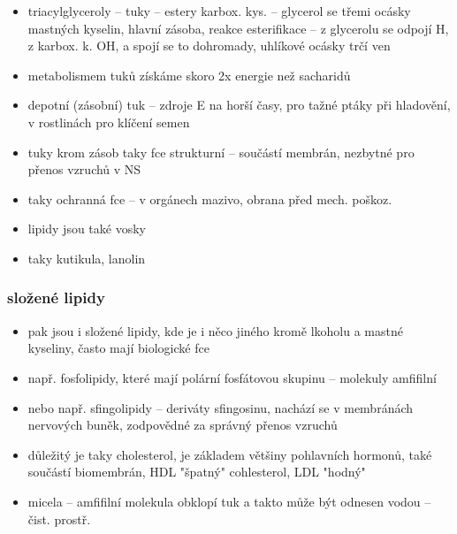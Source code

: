 \documentclass{article}
\begin{document}
\begin{itemize}
\begin{minipage}{0.5\textwidth}
  \end{minipage}
  \item triacylglyceroly -- tuky -- estery karbox. kys. -- glycerol se třemi ocásky mastných kyselin, hlavní zásoba, reakce esterifikace -- z glycerolu se odpojí H, z karbox. k. OH, a spojí se to dohromady, uhlíkové ocásky trčí ven
  \item metabolismem tuků získáme skoro 2x energie než sacharidů
  \item depotní (zásobní) tuk -- zdroje E na horší časy, pro tažné ptáky při hladovění, v rostlinách pro klíčení semen
  \item tuky krom zásob taky fce strukturní -- součástí membrán, nezbytné pro přenos vzruchů v NS
  \item taky ochranná fce -- v orgánech mazivo, obrana před mech. poškoz.
  \item lipidy jsou také vosky
  \item taky kutikula, lanolin
\end{itemize}
\subsubsection{složené lipidy}
\begin{itemize}
  \item pak jsou i složené lipidy, kde je i něco jiného kromě lkoholu a mastné kyseliny, často mají biologické fce
  \item např. fosfolipidy, které mají polární fosfátovou skupinu -- molekuly amfifilní
  \item nebo např. sfingolipidy -- deriváty sfingosinu, nachází se v membránách nervových buněk, zodpovědné za správný přenos vzruchů
  \item důležitý je taky cholesterol, je základem většiny pohlavních hormonů, také součástí biomembrán, HDL "špatný" cohlesterol, LDL "hodný"
  \item micela -- amfifilní molekula obklopí tuk a takto může být odnesen vodou -- čist. prostř.
\end{itemize}
\end{document}

